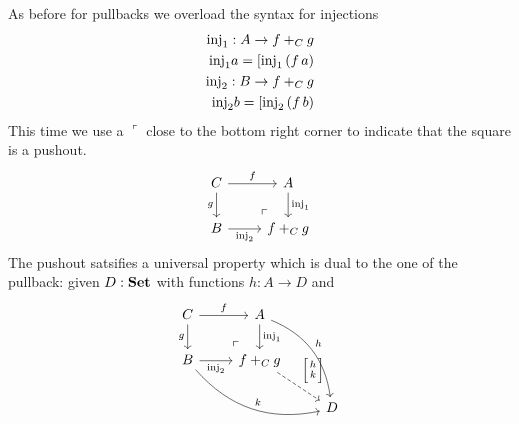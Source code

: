 As before for pullbacks we overload the syntax for injections
\begin{align*}
\mathrm{inj}_1 : A \to f +_C g  \\
\mathrm{inj}_1 a = [ \mathrm{inj}_1\,(f\,a) \\
\mathrm{inj}_2 : B \to f +_C g  \\
\mathrm{inj}_2 b = [ \mathrm{inj}_2\,(f\,b) 
\end{align*}
This time we use a $\ulcorner$ close to the bottom right corner to indicate that the square is a pushout.
\[\begin{tikzcd}
C \arrow[r,"f"]\arrow[d,"g" left] 
\arrow[dr, phantom, "\ulcorner", very near end]
& A \arrow[d,"\inj_1"]\\
B  \arrow[r,"\inj_2" below] & f +_C g
\end{tikzcd}\]
The pushout satsifies a universal property which is dual to the one of the pullback: given $D : \mathbf{Set}$ with functions $h : A \to D$ and 
\[\begin{tikzcd}
C \arrow[r,"f"]\arrow[d,"g" left] 
\arrow[dr, phantom, "\ulcorner", very near end]
& A \arrow[d,"\inj_1"]  \arrow[rdd,bend left,"h"]\\
B  \arrow[r,"\inj_2" below] \arrow[drr,bend right,"k"] & f +_C g 
\arrow[dr,dashrightarrow,"\case{h}{k}"]\\
& & D
\end{tikzcd}\]



